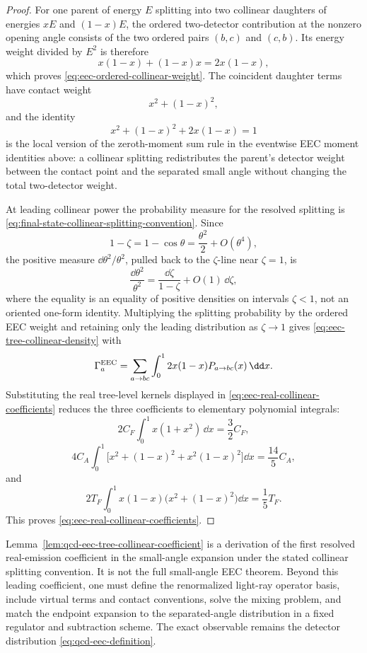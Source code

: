 \begin{proof}
For one parent of energy \(E\) splitting into two collinear daughters of
energies \(xE\) and \((1-x)E\), the ordered two-detector contribution at the
nonzero opening angle consists of the two ordered pairs \((b,c)\) and
\((c,b)\).  Its energy weight divided by \(E^2\) is therefore
\[
  x(1-x)+(1-x)x=2x(1-x),
\]
which proves \eqref{eq:eec-ordered-collinear-weight}.  The coincident
daughter terms have contact weight
\[
  x^2+(1-x)^2,
\]
and the identity
\[
  x^2+(1-x)^2+2x(1-x)=1
\]
is the local version of the zeroth-moment sum rule in
the eventwise EEC moment identities above: a collinear splitting redistributes
the parent's detector weight between the contact point and the separated small
angle without changing the total two-detector weight.

At leading collinear power the probability measure for the resolved splitting
is \eqref{eq:final-state-collinear-splitting-convention}.  Since
\[
  1-\zeta=1-\cos\theta=\frac{\theta^2}{2}+O(\theta^4),
\]
the positive measure \(\dd\theta^2/\theta^2\), pulled back to the
\(\zeta\)-line near \(\zeta=1\), is
\[
  \frac{\dd\theta^2}{\theta^2}
  =
  \frac{\dd\zeta}{1-\zeta}+O(1)\,\dd\zeta ,
\]
where the equality is an equality of positive densities on intervals
\(\zeta<1\), not an oriented one-form identity.
Multiplying the splitting probability by the ordered EEC weight and retaining
only the leading distribution as \(\zeta\to1\) gives
\eqref{eq:eec-tree-collinear-density} with
\[
  \Gamma_a^{\rm EEC}
  =
  \sum_{a\to bc}
  \int_0^1 2x(1-x)P_{a\to bc}(x)\,\dd x .
\]
Substituting the real tree-level kernels displayed in
\eqref{eq:eec-real-collinear-coefficients} reduces the three coefficients to
elementary polynomial integrals:
\[
  2C_F\int_0^1 x(1+x^2)\,\dd x=\frac32C_F,
\]
\[
  4C_A\int_0^1
  \bigl[x^2+(1-x)^2+x^2(1-x)^2\bigr]\dd x
  =
  \frac{14}{5}C_A,
\]
and
\[
  2T_F\int_0^1
  x(1-x)\bigl(x^2+(1-x)^2\bigr)\dd x
  =
  \frac15T_F .
\]
This proves \eqref{eq:eec-real-collinear-coefficients}.
\end{proof}

\begin{remark}
\label{rem:eec-tree-collinear-coefficient-status}
Lemma~\ref{lem:qcd-eec-tree-collinear-coefficient} is a derivation of
the first resolved real-emission coefficient in the small-angle expansion
under the stated collinear splitting convention.  It is not the full
small-angle EEC theorem.  Beyond this leading coefficient, one must define the
renormalized light-ray operator basis, include virtual terms and contact
conventions, solve the mixing problem, and match the endpoint expansion to
the separated-angle distribution in a fixed regulator and subtraction scheme.
The exact observable remains the detector distribution
\eqref{eq:qcd-eec-definition}.
\end{remark}


